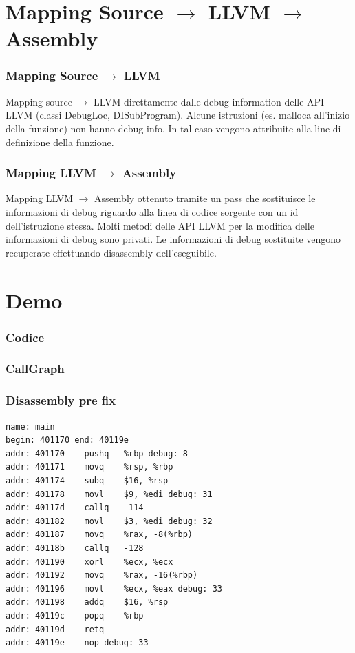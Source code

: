 \documentclass{beamer}
\begin{document}
\section{Mapping Source $\rightarrow$ LLVM $\rightarrow$ Assembly}
\begin{frame}
\frametitle{Mapping Source $\rightarrow$ LLVM}

Mapping source $\rightarrow$ LLVM direttamente dalle debug information delle API LLVM (classi DebugLoc, DISubProgram). \linebreak Alcune istruzioni (es. malloca all'inizio della funzione) non hanno debug info. In tal caso vengono attribuite alla line di definizione della funzione.


\end{frame}

\begin{frame}
\frametitle{Mapping LLVM $\rightarrow$ Assembly}
Mapping LLVM $\rightarrow$ Assembly ottenuto tramite un pass che sostituisce le informazioni di debug riguardo alla linea di codice sorgente con un id dell'istruzione stessa. \linebreak Molti metodi delle API LLVM per la modifica delle informazioni di debug sono privati. \linebreak Le informazioni di debug sostituite vengono recuperate effettuando disassembly dell'eseguibile.
\end{frame}

\section{Demo}

\begin{frame}
\frametitle{Codice}

\end{frame}

\begin{frame}
\frametitle{CallGraph}

\end{frame}

\begin{frame}[fragile]
\frametitle{Disassembly pre fix}
\begin{verbatim}
name: main
begin: 401170 end: 40119e
addr: 401170 	pushq	%rbp debug: 8 
addr: 401171 	movq	%rsp, %rbp 
addr: 401174 	subq	$16, %rsp 
addr: 401178 	movl	$9, %edi debug: 31 
addr: 40117d 	callq	-114 
addr: 401182 	movl	$3, %edi debug: 32 
addr: 401187 	movq	%rax, -8(%rbp) 
addr: 40118b 	callq	-128 
addr: 401190 	xorl	%ecx, %ecx 
addr: 401192 	movq	%rax, -16(%rbp) 
addr: 401196 	movl	%ecx, %eax debug: 33 
addr: 401198 	addq	$16, %rsp 
addr: 40119c 	popq	%rbp 
addr: 40119d 	retq 
addr: 40119e 	nop debug: 33 
\end{verbatim}
\end{frame}
\end{document}
